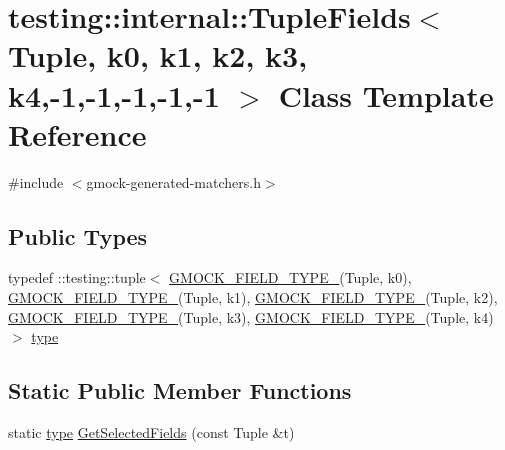 \hypertarget{classtesting_1_1internal_1_1TupleFields_3_01Tuple_00_01k0_00_01k1_00_01k2_00_01k3_00_01k4_00-1_00-1_00-1_00-1_00-1_01_4}{}\section{testing\+:\+:internal\+:\+:Tuple\+Fields$<$ Tuple, k0, k1, k2, k3, k4,-\/1,-\/1,-\/1,-\/1,-\/1 $>$ Class Template Reference}
\label{classtesting_1_1internal_1_1TupleFields_3_01Tuple_00_01k0_00_01k1_00_01k2_00_01k3_00_01k4_00-1_00-1_00-1_00-1_00-1_01_4}


{\ttfamily \#include $<$gmock-\/generated-\/matchers.\+h$>$}

\subsection*{Public Types}
\begin{DoxyCompactItemize}
\item 
typedef \+::testing\+::tuple$<$ \hyperlink{gmock-generated-matchers_8h_acf3e27de83a73f0d873da1cd471e505b}{G\+M\+O\+C\+K\+\_\+\+F\+I\+E\+L\+D\+\_\+\+T\+Y\+P\+E\+\_\+}(Tuple, k0), \hyperlink{gmock-generated-matchers_8h_acf3e27de83a73f0d873da1cd471e505b}{G\+M\+O\+C\+K\+\_\+\+F\+I\+E\+L\+D\+\_\+\+T\+Y\+P\+E\+\_\+}(Tuple, k1), \hyperlink{gmock-generated-matchers_8h_acf3e27de83a73f0d873da1cd471e505b}{G\+M\+O\+C\+K\+\_\+\+F\+I\+E\+L\+D\+\_\+\+T\+Y\+P\+E\+\_\+}(Tuple, k2), \hyperlink{gmock-generated-matchers_8h_acf3e27de83a73f0d873da1cd471e505b}{G\+M\+O\+C\+K\+\_\+\+F\+I\+E\+L\+D\+\_\+\+T\+Y\+P\+E\+\_\+}(Tuple, k3), \hyperlink{gmock-generated-matchers_8h_acf3e27de83a73f0d873da1cd471e505b}{G\+M\+O\+C\+K\+\_\+\+F\+I\+E\+L\+D\+\_\+\+T\+Y\+P\+E\+\_\+}(Tuple, k4)$>$ \hyperlink{classtesting_1_1internal_1_1TupleFields_3_01Tuple_00_01k0_00_01k1_00_01k2_00_01k3_00_01k4_00-1_00-1_00-1_00-1_00-1_01_4_a0f2600b6a8009ead7c04545648de2033}{type}
\end{DoxyCompactItemize}
\subsection*{Static Public Member Functions}
\begin{DoxyCompactItemize}
\item 
static \hyperlink{classtesting_1_1internal_1_1TupleFields_3_01Tuple_00_01k0_00_01k1_00_01k2_00_01k3_00_01k4_00-1_00-1_00-1_00-1_00-1_01_4_a0f2600b6a8009ead7c04545648de2033}{type} \hyperlink{classtesting_1_1internal_1_1TupleFields_3_01Tuple_00_01k0_00_01k1_00_01k2_00_01k3_00_01k4_00-1_00-1_00-1_00-1_00-1_01_4_a30807ca848bc2f05bf18c7837a82b9c3}{Get\+Selected\+Fields} (const Tuple \&t)
\end{DoxyCompactItemize}



